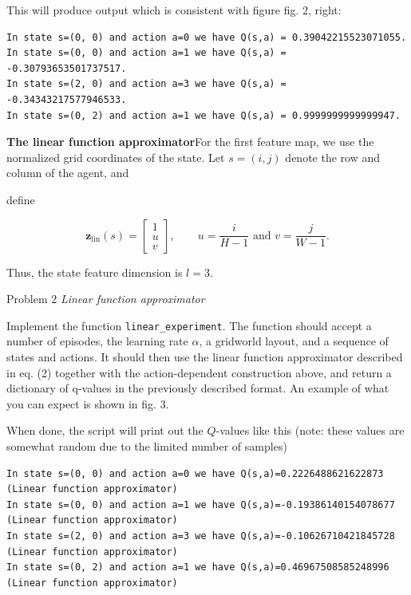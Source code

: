 \documentclass[11pt]{article}
\newcommand{\inlinecode}[1]{\colorbox{gray!15}{\texttt{#1}}}
\begin{document}
This will produce output which is consistent with figure fig. 2, right:

\begin{lstlisting}[style=textstyle]
In state s=(0, 0) and action a=0 we have Q(s,a) = 0.39042215523071055.
In state s=(0, 0) and action a=1 we have Q(s,a) = -0.30793653501737517.
In state s=(2, 0) and action a=3 we have Q(s,a) = -0.34343217577946533.
In state s=(0, 2) and action a=1 we have Q(s,a) = 0.9999999999999947.
\end{lstlisting}

\textbf{The linear function approximator}\quad For the first feature map, we use the normalized grid coordinates of the state. Let $s=(i,j)$ denote the row and column of the agent, and

\newpage

define

\begin{equation}
\boldsymbol{z}_{\mathrm{lin}}(s)=
\begin{bmatrix}
1\\
u\\
v
\end{bmatrix},
\qquad
u=\frac{i}{H-1}\text{ and }v=\frac{j}{W-1}.
\tag{2}
\end{equation}

Thus, the state feature dimension is $l=3$.

\begin{tcolorbox}[colback=gray!10,colframe=gray!55,boxrule=0.7pt,arc=2mm,left=12pt,right=12pt,top=8pt,bottom=10pt]
{\fontsize{16}{18}\selectfont Problem 2 \textit{Linear function approximator}}\par
\vspace{0.35em}
Implement the function \inlinecode{linear\_experiment}. The function should accept a number of episodes, the learning rate $\alpha$, a gridworld layout, and a sequence of states and actions. It should then use the linear function approximator described in eq. (2) together with the action-dependent construction above, and return a dictionary of q-values in the previously described format. An example of what you can expect is shown in fig. 3.
\end{tcolorbox}

When done, the script will print out the $Q$-values like this (note: these values are somewhat random due to the limited number of samples)

\begin{lstlisting}[style=textstyle]
In state s=(0, 0) and action a=0 we have Q(s,a)=0.2226488621622873 (Linear function approximator)
In state s=(0, 0) and action a=1 we have Q(s,a)=-0.19386140154078677 (Linear function approximator)
In state s=(2, 0) and action a=3 we have Q(s,a)=-0.10626710421845728 (Linear function approximator)
In state s=(0, 2) and action a=1 we have Q(s,a)=0.46967508585248996 (Linear function approximator)
\end{lstlisting}
\end{document}
